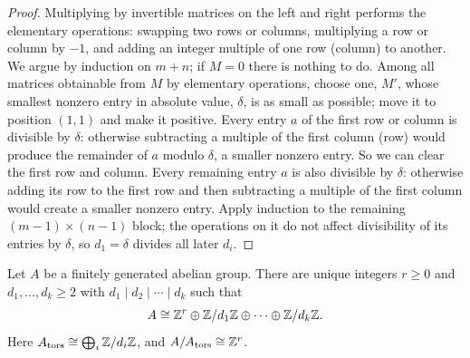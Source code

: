 \begin{proof}
Multiplying by invertible matrices on the left and right performs the elementary
operations: swapping two rows or columns, multiplying a row or column by $-1$, and
adding an integer multiple of one row (column) to another. We argue by induction on
$m + n$; if $M = 0$ there is nothing to do. Among all matrices obtainable from $M$ by
elementary operations, choose one, $M'$, whose smallest nonzero entry in absolute
value, $\delta$, is as small as possible; move it to position $(1,1)$ and make it
positive. Every entry $a$ of the first row or column is divisible by $\delta$: otherwise
subtracting a multiple of the first column (row) would produce the remainder of $a$
modulo $\delta$, a smaller nonzero entry. So we can clear the first row and column.
Every remaining entry $a$ is also divisible by $\delta$: otherwise adding its row to the
first row and then subtracting a multiple of the first column would create a smaller
nonzero entry. Apply induction to the remaining $(m-1) \times (n-1)$ block; the
operations on it do not affect divisibility of its entries by $\delta$, so $d_1 = \delta$
divides all later $d_i$.
\end{proof}

\begin{theorem}\label{groups:theorem-structure-abelian}
Let $A$ be a finitely generated abelian group. There are unique integers
$r \geq 0$ and $d_1, \ldots, d_k \geq 2$ with $d_1 \mid d_2 \mid \cdots \mid d_k$ such that
\[
A \cong \mathbb{Z}^r \oplus \mathbb{Z}/d_1\mathbb{Z} \oplus \cdots \oplus \mathbb{Z}/d_k\mathbb{Z}.
\]
Here $A_{\mathrm{tors}} \cong \bigoplus_i \mathbb{Z}/d_i\mathbb{Z}$, and $A/A_{\mathrm{tors}} \cong \mathbb{Z}^r$.
\end{theorem}

